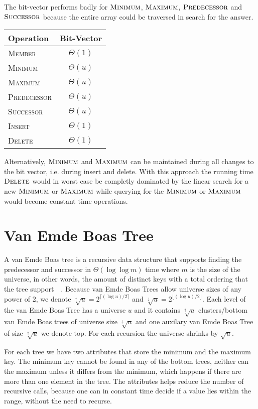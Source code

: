 \documentclass[oneside,11pt,openright]{report}
\newcommand{\BigT}[1]{\ensuremath{\Theta\left(#1\right)}}
\newcommand{\Insert}{\textsc{Insert}}
\newcommand{\Delete}{\textsc{Delete}}
\newcommand{\Member}{\textsc{Member}}
\newcommand{\Minimum}{\textsc{Minimum}}
\newcommand{\Maximum}{\textsc{Maximum}}
\newcommand{\Predecessor}{\textsc{Predecessor}}
\newcommand{\Successor}{\textsc{Successor}}
\newcommand{\HIGHER}{\sqrt[\uparrow]{u}}
\newcommand{\LOWER}{\sqrt[\downarrow]{u}}
\begin{document}
The bit-vector performs badly for $\Minimum$, $\Maximum$,
$\Predecessor$ and $\Successor$ because the entire array could be
traversed in search for the answer.

\begin{center}
  \begin{tabular}{ l | c }
    Operation & Bit-Vector  \\ \hline
    \Member & $\BigT{1}$ \\ 
    \Minimum & $\BigT{u}$ \\ 
    \Maximum & $\BigT{u}$ \\ 
    \Predecessor & $\BigT{u}$ \\ 
    \Successor & $\BigT{u}$ \\ 
    \Insert & $\BigT{1}$ \\ 
    \Delete & $\BigT{1}$ \\
  \end{tabular}
\end{center}

Alternatively, $\Minimum$ and $\Maximum$ can be maintained during all
changes to the bit vector, i.e. during insert and delete. With this
approach the running time $\Delete$ would in worst case be completly
dominated by the linear search for a new $\Minimum$ or $\Maximum$ while
querying for the $\Minimum$ or $\Maximum$ would become constant time
operations.

\chapter{Van Emde Boas Tree}

A van Emde Boas tree is a recursive data structure that supports
finding the predecessor and successor in \BigT{\log \log m} time where
$m$ is the size of the universe, in other words, the amount of
distinct keys with a total ordering that the tree
support~\cite[p. 545]{ITA09}~\cite{VEB04}. Because van Emde Boas Trees
allow universe sizes of any power of 2, we denote $\HIGHER =
2^{\lceil{(\log u)/2}\rceil}$ and $\LOWER = 2^{\lfloor{(\log
    u)/2}\rfloor}$.  Each level of the van Emde Boas Tree has a
universe $u$ and it contains $\HIGHER$ clusters/bottom van Emde Boas
trees of universe size $\LOWER$ and one auxilary van Emde Boas Tree of
size $\HIGHER$ we denote top.  For each recursion the universe shrinks
by $\sqrt{u}$.

For each tree we have two attributes that store the minimum and the
maximum key. The minimum key cannot be found in any of the bottom
trees, neither can the maximum unless it differs from the minimum,
which happens if there are more than one element in the tree. The
attributes helps reduce the number of recursive calls, because one can
in constant time decide if a value lies within the range, without the
need to recurse.
\end{document}
